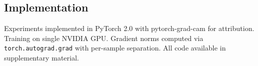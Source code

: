\subsection{Implementation}

Experiments implemented in PyTorch 2.0 with pytorch-grad-cam for attribution. Training on single NVIDIA GPU. Gradient norms computed via \texttt{torch.autograd.grad} with per-sample separation. All code available in supplementary material.

